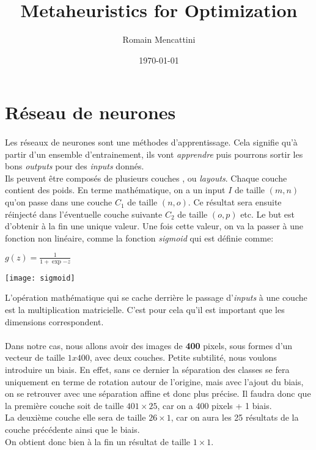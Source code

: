 \documentclass[a4paper, 11pt]{article}
\title{Metaheuristics for Optimization}
\author{Romain Mencattini}
\date{\today}
\begin{document}
\maketitle
\newpage
\tableofcontents
\newpage

\section{Réseau de neurones}

\paragraph{}Les réseaux de neurones sont une méthodes d'apprentissage. Cela signifie qu'à partir d'un ensemble d'entrainement, 
ils vont \textit{apprendre} puis pourrons sortir les bons \textit{outputs} pour des \textit{inputs} donnés.\\
Ils peuvent être composés de plusieurs couches , ou \textit{layouts}. Chaque couche contient des poids.
En terme mathématique, on a un input $I$ de taille $(m,n)$ qu'on passe dans une couche $C_1$ de taille $(n,o)$. Ce résultat sera ensuite
réinjecté dans l'éventuelle couche suivante $C_2$ de taille $(o,p)$ etc. Le but est d'obtenir à la fin une unique valeur.
Une fois cette valeur, on va la passer à une fonction non linéaire, comme la fonction \textit{sigmoid} qui est définie comme:\\
\begin{center}
 \begin{math}
  g(z) = \frac{1}{1 + \exp{-z}}
 \end{math} 
\end{center}

 \texttt{[image: sigmoid]}
 
 L'opération mathématique qui se cache derrière le passage d'\textit{inputs} à une couche est la multiplication matricielle. C'est pour
 cela qu'il est important que les dimensions correspondent.
 
 \paragraph{}
 Dans notre cas, nous allons avoir des images de \textbf{400} pixels, sous formes d'un vecteur de taille $1x400$, avec deux couches.
 Petite subtilité, nous voulons introduire un biais. En effet, sans ce dernier la séparation des classes se fera uniquement en terme de
 rotation autour de l'origine, mais avec l'ajout du biais, on se retrouver avec une séparation affine et donc plus précise.
 Il faudra donc que la première couche soit de taille $401\times25$, car on a 400 pixels + 1 biais.\\
 La deuxième couche elle sera de taille $26\times1$, car on aura les 25 résultats de la couche précédente ainsi que le biais.\\
 On obtient donc bien à la fin un résultat de taille $1\times1$.
\end{document}
